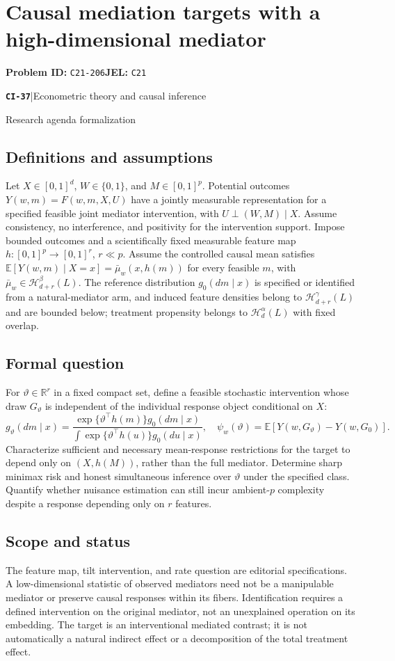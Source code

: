 \documentclass[11pt,a4paper]{article}
\newcommand{\R}{\mathbb R}
\newcommand{\E}{\mathbb E}
\newcommand{\entrymeta}[3]{{\sffamily\small\color{muted}\textbf{\texttt{#1}}\quad|\quad #2\par #3\par}}
\begin{document}
\section*{Causal mediation targets with a high-dimensional mediator}
\textbf{Problem ID:} \texttt{C21-206}\quad \textbf{JEL:} \texttt{C21}\par
\label{problem:OP-0516}
\label{beyond:CI-37}
\entrymeta{CI-37}{Econometric theory and causal inference}{Research agenda formalization}
\subsection*{Definitions and assumptions}
Let $X\in[0,1]^d$, $W\in\{0,1\}$, and $M\in[0,1]^p$. Potential outcomes $Y(w,m)=F(w,m,X,U)$ have a jointly measurable representation for a specified feasible joint mediator intervention, with $U\perp(W,M)\mid X$. Assume consistency, no interference, and positivity for the intervention support. Impose bounded outcomes and a scientifically fixed measurable feature map $h:[0,1]^p\to[0,1]^r$, $r\ll p$. Assume the controlled causal mean satisfies $\E[Y(w,m)\mid X=x]=\bar\mu_w(x,h(m))$ for every feasible $m$, with $\bar\mu_w\in\mathcal H_{d+r}^\beta(L)$. The reference distribution $g_0(dm\mid x)$ is specified or identified from a natural-mediator arm, and induced feature densities belong to $\mathcal H_{d+r}^\gamma(L)$ and are bounded below; treatment propensity belongs to $\mathcal H_d^\alpha(L)$ with fixed overlap.
\subsection*{Formal question}
For $\vartheta\in\R^r$ in a fixed compact set, define a feasible stochastic intervention whose draw $G_\vartheta$ is independent of the individual response object conditional on $X$:
\[
 g_\vartheta(dm\mid x)=
 \frac{\exp\{\vartheta^\top h(m)\}g_0(dm\mid x)}
      {\int\exp\{\vartheta^\top h(u)\}g_0(du\mid x)},
 \quad \psi_w(\vartheta)=\E[Y(w,G_\vartheta)-Y(w,G_0)].
\]
Characterize sufficient and necessary mean-response restrictions for the target to depend only on $(X,h(M))$, rather than the full mediator. Determine sharp minimax risk and honest simultaneous inference over $\vartheta$ under the specified class. Quantify whether nuisance estimation can still incur ambient-$p$ complexity despite a response depending only on $r$ features.
\subsection*{Scope and status}
The feature map, tilt intervention, and rate question are editorial specifications. A low-dimensional statistic of observed mediators need not be a manipulable mediator or preserve causal responses within its fibers. Identification requires a defined intervention on the original mediator, not an unexplained operation on its embedding. The target is an interventional mediated contrast; it is not automatically a natural indirect effect or a decomposition of the total treatment effect.
\end{document}
